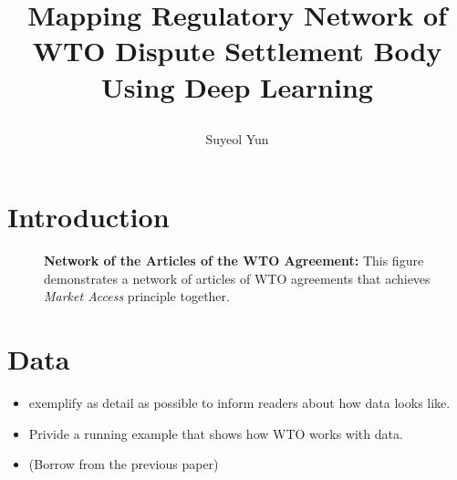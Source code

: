 \documentclass[12pt,letterpaper]{article}
\newcommand{\tit}{
\bf 
Mapping Regulatory Network of WTO Dispute Settlement Body Using Deep Learning
}
\newcommand\spacingset[1]{\renewcommand{\baselinestretch}
{#1}\small\normalsize}
\begin{document}
\spacingset{1.25}

\setcounter{page}{0}
\vspace{-.1in}

{\title{
    \tit
  }
  \author{Suyeol Yun
  }
  \maketitle
}

\thispagestyle{empty}
\vspace{-.1in}

\begin{abstract}
  \lipsum[1]
\end{abstract}

\spacingset{1.5} %

% 

\section{Introduction}










\begin{figure}
  \centering{
    
  }
  \caption{{\bf Network of the Articles of the WTO Agreement:} 
  This figure demonstrates a network of articles of WTO agreements
  that achieves \textit{Market Access} principle together.
  }
  \label{fig:market-aceess_directed}
\end{figure}

\section{Data}

\begin{itemize}
  \item exemplify as detail as possible to inform readers about how data looks like.
  \item Privide a running example that shows how WTO works with data. 
  \item (Borrow from the previous paper)
  
\end{itemize}
\end{document}
